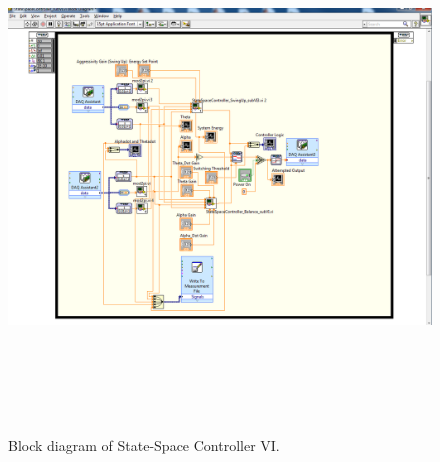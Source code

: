 \documentclass{article}
\theoremstyle{plain}
\theoremstyle{definition}
\theoremstyle{remark}
\begin{document}
\begin{figure}[htb]
\begin{center}
\includegraphics[width = 16cm, height = 14cm]{q6_b2.png}
\end{center}
\caption{Block diagram of State-Space Controller VI.}
\label{q6_b2}
\end{figure}
\end{document}
